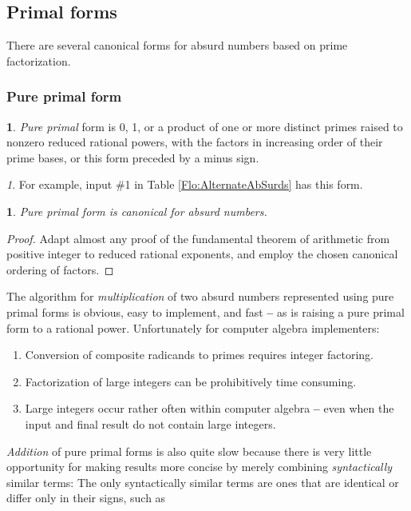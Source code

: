 \documentclass[12pt,english]{article}
\theoremstyle{definition}
\newtheorem*{defn*}{\protect\definitionname}
\theoremstyle{remark}
\newtheorem*{rem*}{\protect\remarkname}
\theoremstyle{plain}
\theoremstyle{plain}
\newtheorem{prop}[thm]{\protect\propositionname}
\providecommand{\definitionname}{Definition}
\providecommand{\propositionname}{Proposition}
\providecommand{\remarkname}{Remark}
\begin{document}
\subsection{Primal forms}

There are several canonical forms for absurd numbers based on prime
factorization.


\subsubsection{Pure primal form\emph{\vspace{0.3em}
}}
\begin{defn*}
\textsl{Pure primal} form is 0, 1, or a product of one or more distinct
primes raised to nonzero reduced rational powers, with the factors
in increasing order of their prime bases, or this form preceded by
a minus sign.\end{defn*}
\begin{rem*}
For example, input \#1 in Table \ref{Flo:AlternateAbSurds} has this
form.\end{rem*}
\begin{prop}
Pure primal form is canonical for absurd numbers.\end{prop}
\begin{proof}
Adapt almost any proof of the fundamental theorem of arithmetic from
positive integer to reduced rational exponents, and employ the chosen
canonical ordering of factors.
\end{proof}
The algorithm for \textsl{multiplication} of two absurd numbers represented
using pure primal forms is obvious, easy to implement, and fast \textbf{--}
as is raising a pure primal form to a rational power. Unfortunately
for computer algebra implementers:
\begin{enumerate}
\item Conversion of composite radicands to primes requires integer factoring.
\item Factorization of large integers can be prohibitively time consuming.
\item Large integers occur rather often within computer algebra \textbf{--}
even when the input and final result do not contain large integers.
\end{enumerate}
\textsl{Addition} of pure primal forms is also quite slow because
there is very little opportunity for making results more concise by
merely combining \textsl{syntactically} similar terms: The only syntactically
similar terms are ones that are identical or differ only in their
signs, such as
\end{document}

